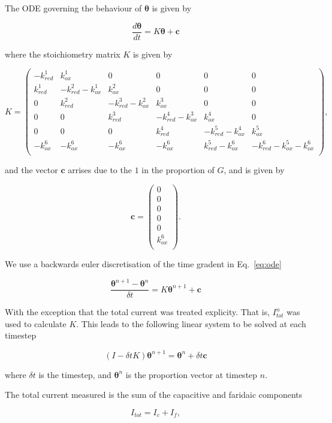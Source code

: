 \documentclass[a4paper, 12pt]{article}
\begin{document}
The ODE governing the behaviour of $\bm{\theta}$ is given by

$$
\label{eq:ode}
\frac{d\bm{\theta}}{dt} = K \bm{\theta} + \mathbf{c}
$$

where the stoichiometry matrix $K$ is given by

$$
K = \begin{pmatrix}
    - k^1_{red} & k^1_{ox} & 0 & 0 & 0 & 0 \\
      k^1_{red} & -k^2_{red}-k^1_{ox} & k^2_{ox} & 0 & 0 & 0 \\
      0 & k^2_{red} & -k^3_{red}-k^2_{ox} & k^3_{ox} & 0 & 0 \\
      0 & 0 & k^3_{red} & -k^4_{red}-k^3_{ox} &  k^4_{ox} & 0 \\
      0 & 0 & 0 & k^4_{red} & -k^5_{red}-k^4_{ox} & k^5_{ox} \\
      -k^6_{ox} & -k^6_{ox} & -k^6_{ox} & -k^6_{ox} & k^5_{red} -k^6_{ox}& 
      -k^6_{red}-k^5_{ox} -k^6_{ox}\\
\end{pmatrix},
$$

and the vector $\mathbf{c}$ arrises due to the $1$ in the proportion of $G$, and 
is given by

$$
\mathbf{c} = \begin{pmatrix}
    0 \\
    0 \\
    0 \\
    0 \\
    0 \\
    k^6_{ox} \\
\end{pmatrix}.
$$

We use a backwards euler discretisation of the time gradent in Eq.~\ref{eq:ode}

$$
\frac{\bm{\theta}^{n+1} - \bm{\theta}^{n}}{\delta t} = K \bm{\theta}^{n+1} +
\mathbf{c}
$$

With the exception that the total current was treated explicity. That is, 
$I_{tot}^n$ was used to calculate $K$. This leads to the following linear system 
to be solved at each timestep

$$
(I - \delta t K)\bm{\theta}^{n+1} = \bm{\theta}^n + \delta t \mathbf{c}
$$

where $\delta t$ is the timestep, and $\bm{\theta}^n$ is the proportion vector 
at timestep $n$.


The total current measured is the sum of the capacitive and faridaic components

$$
I_{tot} = I_c + I_f,
$$
\end{document}
